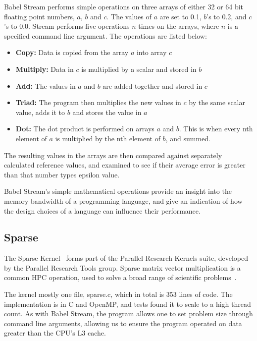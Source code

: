 Babel Stream performs simple operations on three arrays of either 32 or 64 bit floating point numbers, $a$, $b$ and $c$. The values of $a$ are set to 0.1, $b$'s to 0.2, and $c$'s to 0.0. Stream performs five operations $n$ times on the arrays, where $n$ is a specified command line argument. The operations are listed below:
\begin{itemize}
  \item \textbf{Copy:} Data is copied from the array $a$ into array $c$
  \item \textbf{Multiply:} Data in $c$ is multiplied by a scalar and stored in $b$
  \item \textbf{Add:} The values in $a$ and $b$ are added together and stored in $c$
  \item \textbf{Triad:} The program then multiplies the new values in $c$ by the same scalar value, adds it to $b$ and stores the value in $a$
  \item \textbf{Dot:} The dot product is performed on arrays $a$ and $b$. This is when every nth element of $a$ is multiplied by the nth element of $b$, and summed.
\end{itemize}
The resulting values in the arrays are then compared against separately calculated reference values, and examined to see if their average error is greater than that number types epsilon value.

Babel Stream's simple mathematical operations provide an insight into the memory bandwidth of a programming language, and give an indication of how the  design choices of a language can influence their performance.

\subsection{Sparse}

The Sparse Kernel~\cite{ParResSparse} forms part of the Parallel Research Kernels suite, developed by the Parallel Research Tools group. Sparse matrix vector multiplication is a common HPC operation, used to solve a broad range of scientific problems~\cite{Sedaghati:2015, spMVGPU, DBLP:journals}.

The kernel mostly one file, sparse.c, which in total is 353 lines of code. The implementation is in C and OpenMP, and tests found it to scale to a high thread count. As with Babel Stream, the program allows one to set problem size through command line arguments, allowing us to ensure the program operated on data greater than the CPU's L3 cache.

